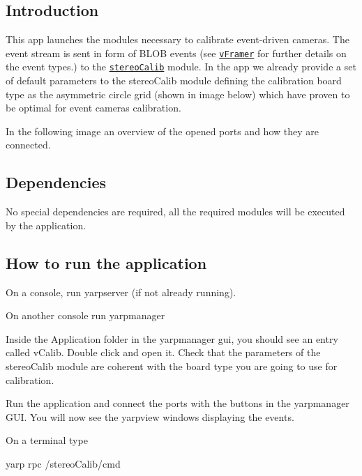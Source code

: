 \subsection*{Introduction }

This app launches the modules necessary to calibrate event-\/driven cameras. The event stream is sent in form of B\+L\+OB events (see \href{http://robotology.github.io/event-driven/doxygen/doc/html/group__vFramer.html}{\tt v\+Framer} for further details on the event types.) to the \href{http://wiki.icub.org/iCub/main/dox/html/group__icub__stereoCalib.html}{\tt stereo\+Calib} module. In the app we already provide a set of default parameters to the stereo\+Calib module defining the calibration board type as the asymmetric circle grid (shown in image below) which have proven to be optimal for event cameras calibration.



In the following image an overview of the opened ports and how they are connected.



\subsection*{Dependencies }

No special dependencies are required, all the required modules will be executed by the application.

\subsection*{How to run the application }


\begin{DoxyItemize}
\item On a console, run yarpserver (if not already running).
\item On another console run yarpmanager
\item Inside the Application folder in the yarpmanager gui, you should see an entry called v\+Calib. Double click and open it. Check that the parameters of the stereo\+Calib module are coherent with the board type you are going to use for calibration.
\item Run the application and connect the ports with the buttons in the yarpmanager G\+UI. You will now see the yarpview windows displaying the events.
\item On a terminal type \begin{DoxyVerb}  yarp rpc /stereoCalib/cmd
\end{DoxyVerb}

\end{DoxyItemize}


